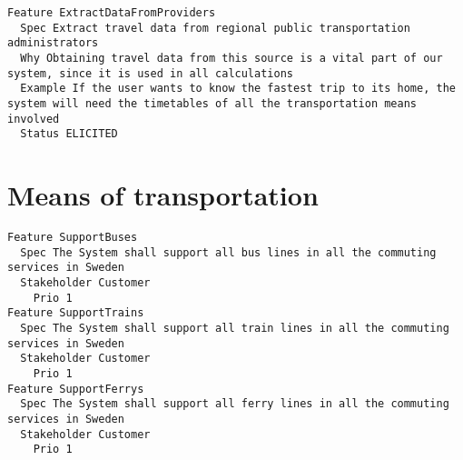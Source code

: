 \begin{lstlisting}
Feature ExtractDataFromProviders
  Spec Extract travel data from regional public transportation administrators
  Why Obtaining travel data from this source is a vital part of our system, since it is used in all calculations
  Example If the user wants to know the fastest trip to its home, the system will need the timetables of all the transportation means involved
  Status ELICITED

\end{lstlisting}
    
        
       \section{Means of transportation}


\begin{lstlisting}
Feature SupportBuses
  Spec The System shall support all bus lines in all the commuting services in Sweden
  Stakeholder Customer
    Prio 1
Feature SupportTrains
  Spec The System shall support all train lines in all the commuting services in Sweden
  Stakeholder Customer
    Prio 1
Feature SupportFerrys
  Spec The System shall support all ferry lines in all the commuting services in Sweden
  Stakeholder Customer
    Prio 1

\end{lstlisting}